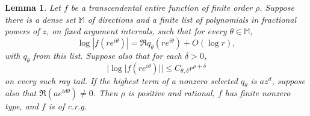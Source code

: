 \documentclass[a4paper,12pt]{article}
\newtheorem{lemma}[defin]{Lemma}
\numberwithin{equation}{section}
\begin{document}
\begin{lemma}\label{lem.order.crg}
Let $f$ be a transcendental entire function of finite order $\rho$.
Suppose there is a dense set $\mathbb M$ of directions and a finite list
of polynomials in fractional powers of $z$, on fixed argument intervals,
such that for every $\theta\in\mathbb M$,
\begin{equation}\label{eq.phase.hypothesis}
 \log|f(re^{i\theta})|=\Re q_\theta(re^{i\theta})+O(\log r),
\end{equation}
with $q_\theta$ from this list. Suppose also that for each $\delta>0$,
\begin{equation}\label{eq.two.sided.hypothesis}
 |\log|f(re^{i\theta})||\le C_{\theta,\delta}r^{\rho+\delta}
\end{equation}
on every such ray tail. If the highest term of a nonzero selected
$q_\theta$ is $a z^d$, suppose also that $\Re(a e^{id\theta})\ne0$.
Then $\rho$ is positive and rational, $f$ has finite nonzero type, and
$f$ is of \textit{c.r.g}.
\end{lemma}
\end{document}
